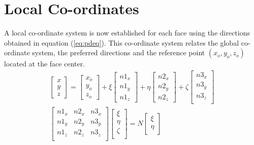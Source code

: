 \section{Local Co-ordinates}
    \label{sec:lc}
  \hspace{0.25cm}  A local co-ordinate system is now established for each face using the directions obtained in equation (\ref{eq:pdeq}). This co-ordinate system relates the global co-ordinate system, the preferred directions and the reference point $(x_o,y_o,z_o)$ located at the face center. 
    \begin{equation}
    \begin{gathered}
    \label{eq:lcs}
    \begin{bmatrix}
    x\\
    y\\
    z
    \end{bmatrix}= \begin{bmatrix}
    x_o\\
    y_o\\
    z_o
    \end{bmatrix}+\xi \begin{bmatrix}
    n1_x\\
    n1_y\\
    n1_z
    \end{bmatrix}+\eta\begin{bmatrix}
    n2_x\\
    n2_y\\
    n2_z
    \end{bmatrix}+\zeta\begin{bmatrix}
    n3_x\\
    n3_y\\
    n3_z\\
    \end{bmatrix}\\
    \begin{bmatrix}
    n1_x & n2_x & n3_x\\
    n1_y & n2_y & n3_y\\
    n1_z & n2_z & n3_z\\
    \end{bmatrix} 
    \begin{bmatrix}
    \xi\\
    \eta\\
    \zeta\\
    \end{bmatrix}=N\begin{bmatrix}
    \xi\\
    \eta\\

\end{bmatrix}
\end{gathered}
\end{equation}

